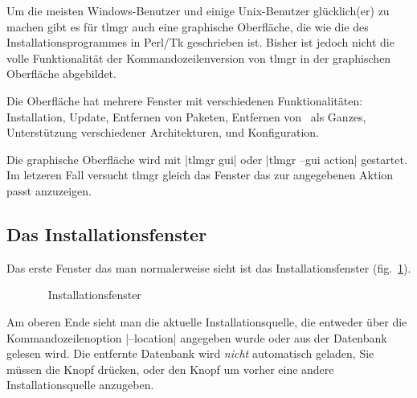Um die meisten Windows-Benutzer und einige Unix-Benutzer glücklich(er)
zu machen gibt es für tlmgr auch eine graphische Oberfläche, die wie
die des Installationsprogrammes in Perl/Tk geschrieben ist.
Bisher ist jedoch nicht die volle Funktionalität der Kommandozeilenversion
von tlmgr in der graphischen Oberfläche abgebildet.

Die Oberfläche hat mehrere Fenster mit verschiedenen Funktionalitäten:
Installation, Update, Entfernen von Paketen, Entfernen von \tl\ als
Ganzes, Unterstützung verschiedener Architekturen, und Konfiguration.

Die graphische Oberfläche wird mit |tlmgr gui| oder |tlmgr --gui action|
gestartet. Im letzeren Fall versucht tlmgr gleich das Fenster das zur
angegebenen Aktion passt anzuzeigen.

\subsection{Das Installationsfenster}

Das erste Fenster das man normalerweise sieht ist das Installationsfenster
(fig.~\ref{fig:gui:install}).

\begin{figure}[ht!]
  \centering
  \caption{\tlmgr\  Installationsfenster}
  \label{fig:gui:install}
\end{figure}

Am oberen Ende sieht man die aktuelle Installationsquelle, die entweder
über die Kommandozeilenoption |--location| angegeben wurde oder aus 
der Datenbank gelesen wird. Die entfernte Datenbank wird \emph{nicht}
automatisch geladen, Sie müssen die  Knopf drücken, oder
den  Knopf um vorher eine andere Installationsquelle
anzugeben. 

